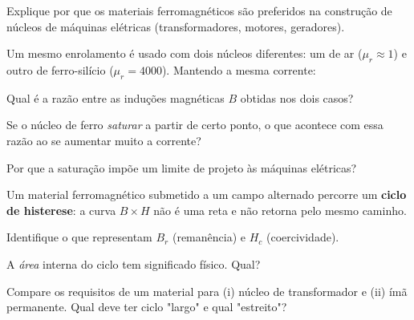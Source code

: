 \blocoaplicacao
\begin{questao}[2]{}

Explique por que os materiais ferromagnéticos são preferidos na construção de
núcleos de máquinas elétricas (transformadores, motores, geradores).


\end{questao}

\blocoaprofundamento
\begin{questao}[3]{}

Um mesmo enrolamento é usado com dois núcleos diferentes: um de ar
($\mu_r \approx 1$) e outro de ferro-silício ($\mu_r = 4000$). Mantendo a mesma
corrente:
\begin{itensq}
\item Qual é a razão entre as induções magnéticas $B$ obtidas nos dois casos?
\item Se o núcleo de ferro \emph{saturar} a partir de certo ponto, o que acontece
      com essa razão ao se aumentar muito a corrente?
\item Por que a saturação impõe um limite de projeto às máquinas elétricas?
\end{itensq}


\end{questao}
\begin{questao}[3]{}

Um material ferromagnético submetido a um campo alternado percorre um
\textbf{ciclo de histerese}: a curva $B \times H$ não é uma reta e não retorna
pelo mesmo caminho.


\begin{itensq}
\item Identifique o que representam $B_r$ (remanência) e $H_c$ (coercividade).
\item A \emph{área} interna do ciclo tem significado físico. Qual?
\item Compare os requisitos de um material para (i) núcleo de transformador e
      (ii) ímã permanente. Qual deve ter ciclo "largo" e qual "estreito"?
\end{itensq}


\end{questao}

